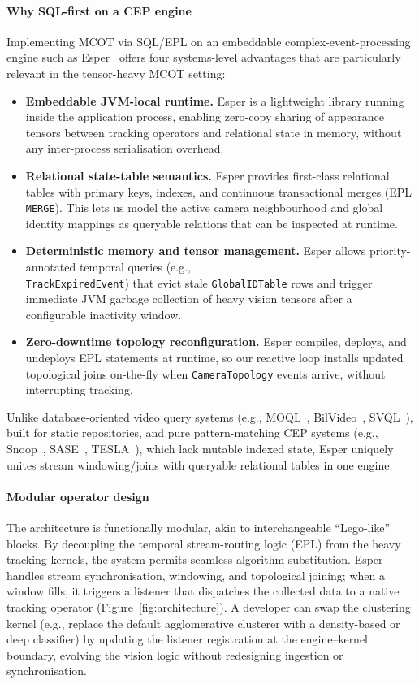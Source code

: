 \documentclass[5p,times]{elsarticle}
\begin{document}
\paragraph{Why SQL-first on a CEP engine}
Implementing MCOT via SQL/EPL on an embeddable complex-event-processing engine such as Esper~\cite{espertech2024} offers four systems-level advantages that are particularly relevant in the tensor-heavy MCOT setting:
\begin{itemize}[leftmargin=*]
    \item \textbf{Embeddable JVM-local runtime.} Esper is a lightweight library running inside the application process, enabling zero-copy sharing of appearance tensors between tracking operators and relational state in memory, without any inter-process serialisation overhead.
    \item \textbf{Relational state-table semantics.} Esper provides first-class relational tables with primary keys, indexes, and continuous transactional merges (EPL \texttt{MERGE}). This lets us model the active camera neighbourhood and global identity mappings as queryable relations that can be inspected at runtime.
    \item \textbf{Deterministic memory and tensor management.} Esper allows priority-annotated temporal queries (e.g.,\\ \texttt{TrackExpiredEvent}) that evict stale \texttt{GlobalIDTable} rows and trigger immediate JVM garbage collection of heavy vision tensors after a configurable inactivity window.
    \item \textbf{Zero-downtime topology reconfiguration.} Esper compiles, deploys, and undeploys EPL statements at runtime, so our reactive loop installs updated topological joins on-the-fly when \texttt{CameraTopology} events arrive, without interrupting tracking.
\end{itemize}
Unlike database-oriented video query systems (e.g., MOQL~\cite{li1997moql}, BilVideo~\cite{donderler2005bilvideo}, SVQL~\cite{lu2015svql}), built for static repositories, and pure pattern-matching CEP systems (e.g., Snoop~\cite{chakravarthy1994snoop}, SASE~\cite{wu2006sase}, TESLA~\cite{cugola2010tesla}), which lack mutable indexed state, Esper uniquely unites stream windowing/joins with queryable relational tables in one engine.

\paragraph{Modular operator design}
The architecture is functionally modular, akin to interchangeable ``Lego-like'' blocks. By decoupling the temporal stream-routing logic (EPL) from the heavy tracking kernels, the system permits seamless algorithm substitution. Esper handles stream synchronisation, windowing, and topological joining; when a window fills, it triggers a listener that dispatches the collected data to a native tracking operator (Figure~\ref{fig:architecture}). A developer can swap the clustering kernel (e.g., replace the default agglomerative clusterer with a density-based or deep classifier) by updating the listener registration at the engine--kernel boundary, evolving the vision logic without redesigning ingestion or synchronisation.
\end{document}

